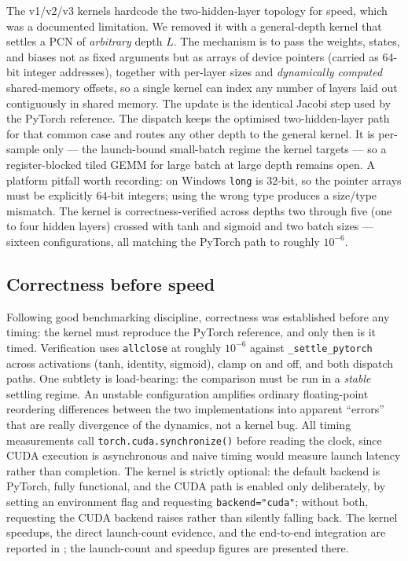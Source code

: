 The v1/v2/v3 kernels hardcode the two-hidden-layer topology for speed, which was a documented
limitation. We removed it with a general-depth kernel that settles a PCN of \emph{arbitrary} depth $L$.
The mechanism is to pass the weights, states, and biases not as fixed arguments but as arrays of device
pointers (carried as 64-bit integer addresses), together with per-layer sizes and \emph{dynamically
computed} shared-memory offsets, so a single kernel can index any number of layers laid out contiguously
in shared memory. The update is the identical Jacobi step used by the PyTorch reference. The dispatch
keeps the optimised two-hidden-layer path for that common case and routes any other depth to the
general kernel. It is per-sample only --- the launch-bound small-batch regime the kernel targets --- so
a register-blocked tiled GEMM for large batch at large depth remains open. A platform pitfall worth
recording: on Windows \texttt{long} is $32$-bit, so the pointer arrays must be explicitly $64$-bit
integers; using the wrong type produces a size/type mismatch. The kernel is correctness-verified across
depths two through five (one to four hidden layers) crossed with tanh and sigmoid and two batch sizes
--- sixteen configurations, all matching the PyTorch path to roughly $10^{-6}$.

\subsection{Correctness before speed}

Following good benchmarking discipline, correctness was established before any timing: the kernel must
reproduce the PyTorch reference, and only then is it timed. Verification uses \texttt{allclose} at
roughly $10^{-6}$ against \texttt{\_settle\_pytorch} across activations (tanh, identity, sigmoid), clamp
on and off, and both dispatch paths. One subtlety is load-bearing: the comparison must be run in a
\emph{stable} settling regime. An unstable configuration amplifies ordinary floating-point reordering
differences between the two implementations into apparent ``errors'' that are really divergence of the
dynamics, not a kernel bug. All timing measurements call \texttt{torch.cuda.synchronize()} before
reading the clock, since CUDA execution is asynchronous and naive timing would measure launch latency
rather than completion. The kernel is strictly optional: the default backend is PyTorch, fully
functional, and the CUDA path is enabled only deliberately, by setting an environment flag and
requesting \texttt{backend="cuda"}; without both, requesting the CUDA backend raises rather than
silently falling back. The kernel speedups, the direct launch-count evidence, and the end-to-end
integration are reported in ; the launch-count and speedup figures are presented
there.

